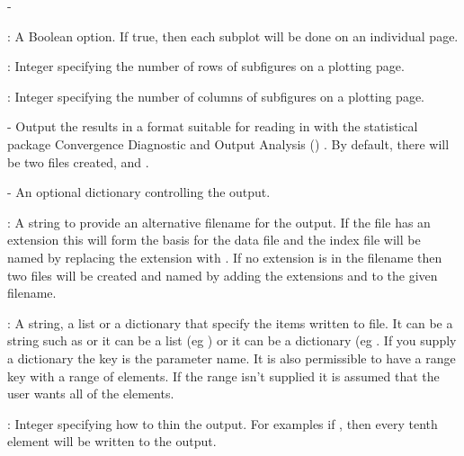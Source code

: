 -\documentclass[article]{jss}
\begin{document}
\begin{description}
\begin{description}
\begin{description}
\begin{description}
    \item {}: A Boolean option. If true, then each
      subplot will be done on an individual page.
    \item {}: Integer specifying the number of rows of
      subfigures on a plotting page.
    \item {}: Integer specifying the number of columns of
      subfigures on a plotting page.
    \end{description}
  \end{description}

\item {} - Output the results in a format
  suitable for reading in with the statistical package Convergence
  Diagnostic and Output Analysis ()
  \citep{Rnews:Plummer+Best+Cowles+Vines:2006}. By default, there will
  be two files created,  and .

    \begin{description}
    \item {} - An optional dictionary controlling the
       output.

      \begin{description}
      \item {}: A string to provide an alternative
        filename for the output.  If the file has an extension this
        will form the basis for the data file and the index file will
        be named by replacing the extension with . If no
        extension is in the filename then two files will be created
        and named by adding the extensions  and 
        to the given filename.
      \item {}: A string, a list or a dictionary that
        specify the items written to file. It can be a string such as
         or it can be a list (eg
        ) or it can be a dictionary (eg \newline
        .  If you supply a
        dictionary the key is the parameter name. It is also
        permissible to have a range key with a range of elements. If
        the range isn't supplied it is assumed that the user wants all
        of the elements.
      \item {}: Integer specifying how to thin the output.
        For examples if , then every tenth element
        will be written to the  output.
      \end{description}
    \end{description}
  \end{description}
\end{description}
\end{document}
